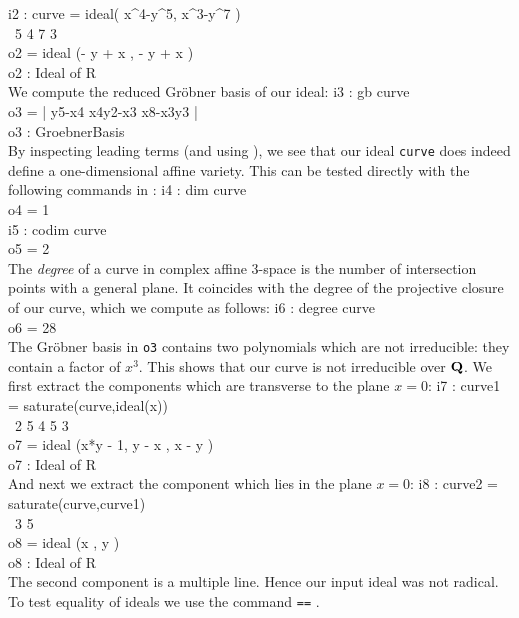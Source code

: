 \beginOutput
i2 : curve = ideal( x^4-y^5, x^3-y^7 )\\
\emptyLine
\               5    4     7    3\\
o2 = ideal (- y  + x , - y  + x )\\
\emptyLine
o2 : Ideal of R\\
\endOutput
We compute the reduced Gr\"obner basis of our ideal:
\beginOutput
i3 : gb curve\\
\emptyLine
o3 = | y5-x4 x4y2-x3 x8-x3y3 |\\
\emptyLine
o3 : GroebnerBasis\\
\endOutput
By inspecting leading terms (and using \cite[\S 9.3, Theorem 8]{CLO1}),
we see that our ideal {\tt curve} does indeed 
define a one-dimensional affine variety. This can be tested directly
with the following commands in \Mtwo:
\beginOutput
i4 : dim curve\\
\emptyLine
o4 = 1\\
\endOutput
\beginOutput
i5 : codim curve\\
\emptyLine
o5 = 2\\
\endOutput
The {\it degree} of a curve in complex affine $3$-space is the 
number of intersection points with a general plane. It coincides
with the degree  \cite[\S 6.4]{CLO2} of the projective closure
\cite[\S 8.4]{CLO1} of our curve, which we compute as follows:
\beginOutput
i6 : degree curve\\
\emptyLine
o6 = 28\\
\endOutput
The Gr\"obner basis in {\tt o3} contains two polynomials which are not
irreducible: they contain a factor of $x^3$. This shows that our curve
is not irreducible over ${\bf Q}$. We first extract the components
which are transverse to the plane $x=0$:
\beginOutput
i7 : curve1 = saturate(curve,ideal(x))\\
\emptyLine
\               2       5    4   5    3\\
o7 = ideal (x*y  - 1, y  - x , x  - y )\\
\emptyLine
o7 : Ideal of R\\
\endOutput
And next we extract the component which lies in the plane $x=0$:
\beginOutput
i8 : curve2 = saturate(curve,curve1)\\
\emptyLine
\             3   5\\
o8 = ideal (x , y )\\
\emptyLine
o8 : Ideal of R\\
\endOutput
The second component is a multiple line. Hence our input ideal was not radical.
To test equality of ideals we use the command {\tt ==}\indexcmd{==} .
